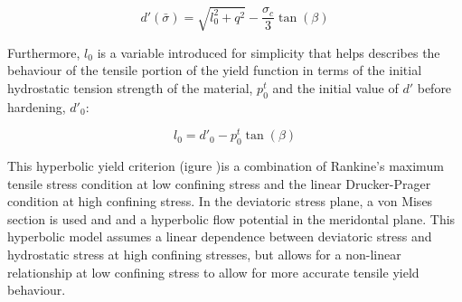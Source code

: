 \begin{equation}
d'\left(\bar{\sigma}\right)=\sqrt{l_{0}^{2}+q^{2}}-\frac{\sigma_c}{3}\tan\left(\beta\right)
\label{eqn:druc2-2}
\end{equation}

Furthermore, $l_0$ is a variable introduced for simplicity that helps describes the behaviour of the tensile portion of the yield function in terms of the initial hydrostatic tension strength of the material, $p_{0}^{t}$ and the initial value of $d'$ before hardening, $d'_{0}$: 

\begin{equation}
l_{0}=d'_{0}-p_{0}^{t}\tan\left(\beta\right)\label{eqn:druc2-1}
\end{equation}

This hyperbolic yield criterion (igure )is a combination of Rankine's maximum tensile stress condition at low confining stress and the linear Drucker-Prager condition at high confining stress. In the deviatoric stress plane, a von Mises section is used and and a hyperbolic flow potential in the meridontal plane. This hyperbolic model assumes a linear dependence between deviatoric stress and hydrostatic stress at high confining stresses, but allows for a non-linear relationship at low confining stress to allow for more accurate tensile yield behaviour.

